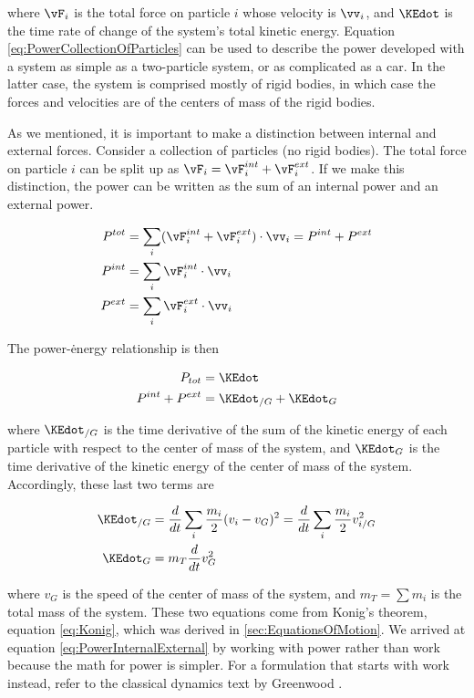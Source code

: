 where $\vF_{i}$ is the total force on particle $i$ whose velocity is $\vv_{i}$, and $\KEdot$ is the time rate of change of the system's total kinetic energy. Equation \ref{eq:PowerCollectionOfParticles} can be used to describe the power developed with a system as simple as a two-particle system, or as complicated as a car. In the latter case, the system is comprised mostly of rigid bodies, in which case the forces and velocities are of the centers of mass of the rigid bodies.

As we mentioned, it is important to make a distinction between internal and external forces. Consider a collection of particles (no rigid bodies). The total force on particle $i$ can be split up as $\vF_{i} = \vF_{i}^{int} + \vF_{i}^{ext}$. If we make this distinction, the power can be written as the sum of an internal power and an external power.

\begin{align}
P^{tot} &= \sum_{i} (\vF_{i}^{int} + \vF_{i}^{ext}) \cdot \vv_{i} = P^{int} + P^{ext}\\
P^{int} &= \sum_{i} \vF_{i}^{int} \cdot \vv_{i} \\
P^{ext} &= \sum_{i} \vF_{i}^{ext} \cdot \vv_{i}
\end{align}

The power-\.{energy} relationship is then

\begin{align}
P_{tot} &=  \KEdot\\
P^{int} + P^{ext} &= \KEdot_{/G} + \KEdot_{G}
\label{eq:PowerInternalExternal}
\end{align}

where $\KEdot_{/G}$ is the time derivative of the sum of the kinetic energy of each particle with respect to the center of mass of the system, and $\KEdot_{G}$ is the time derivative of the kinetic energy of the center of mass of the system. Accordingly, these last two terms are

\begin{align}
\KEdot_{/G} &= \frac{d}{dt} \sum_{i} \frac{m_i}{2}(v_{i} - v_{G})^{2} = \frac{d}{dt} \sum_{i} \frac{m_i}{2} v_{i/G}^{2} \\
\KEdot_{G} &= m_{T} \frac{d}{dt} v_{G}^{2}
\end{align}

where $v_{G}$ is the speed of the center of mass of the system, and $m_{T} = \sum m_i$ is the total mass of the system. These two equations come from Konig's theorem, equation \ref{eq:Konig}, which was derived in \ref{sec:EquationsOfMotion}. We arrived at equation \ref{eq:PowerInternalExternal} by working with power rather than work because the math for power is simpler. For a formulation that starts with work instead, refer to the classical dynamics text by Greenwood \cite{greenwood}.

